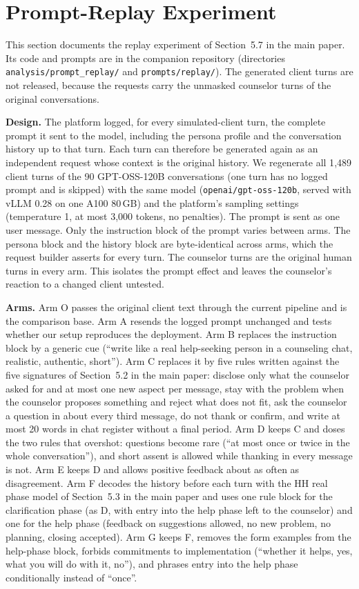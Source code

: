 \documentclass[fleqn,10pt]{JLA_article}
\begin{document}
\section{Prompt-Replay Experiment}
\label{Ssec:replay}
This section documents the replay experiment of Section~5.7 in the main paper. Its code and prompts are in the companion repository (directories \texttt{analysis/prompt\_replay/} and \texttt{prompts/replay/}). The generated client turns are not released, because the requests carry the unmasked counselor turns of the original conversations.

\textbf{Design.} The platform logged, for every simulated-client turn, the complete prompt it sent to the model, including the persona profile and the conversation history up to that turn. Each turn can therefore be generated again as an independent request whose context is the original history. We regenerate all 1{,}489 client turns of the 90 GPT-OSS-120B conversations (one turn has no logged prompt and is skipped) with the same model (\texttt{openai/gpt-oss-120b}, served with vLLM 0.28 on one A100 80\,GB) and the platform's sampling settings (temperature 1, at most 3{,}000 tokens, no penalties). The prompt is sent as one user message. Only the instruction block of the prompt varies between arms. The persona block and the history block are byte-identical across arms, which the request builder asserts for every turn. The counselor turns are the original human turns in every arm. This isolates the prompt effect and leaves the counselor's reaction to a changed client untested.

\textbf{Arms.} Arm O passes the original client text through the current pipeline and is the comparison base. Arm A resends the logged prompt unchanged and tests whether our setup reproduces the deployment. Arm B replaces the instruction block by a generic cue (``write like a real help-seeking person in a counseling chat, realistic, authentic, short''). Arm C replaces it by five rules written against the five signatures of Section~5.2 in the main paper: disclose only what the counselor asked for and at most one new aspect per message, stay with the problem when the counselor proposes something and reject what does not fit, ask the counselor a question in about every third message, do not thank or confirm, and write at most 20 words in chat register without a final period. Arm D keeps C and doses the two rules that overshot: questions become rare (``at most once or twice in the whole conversation''), and short assent is allowed while thanking in every message is not. Arm E keeps D and allows positive feedback about as often as disagreement. Arm F decodes the history before each turn with the HH real phase model of Section~5.3 in the main paper and uses one rule block for the clarification phase (as D, with entry into the help phase left to the counselor) and one for the help phase (feedback on suggestions allowed, no new problem, no planning, closing accepted). Arm G keeps F, removes the form examples from the help-phase block, forbids commitments to implementation (``whether it helps, yes, what you will do with it, no''), and phrases entry into the help phase conditionally instead of ``once''.
\end{document}
